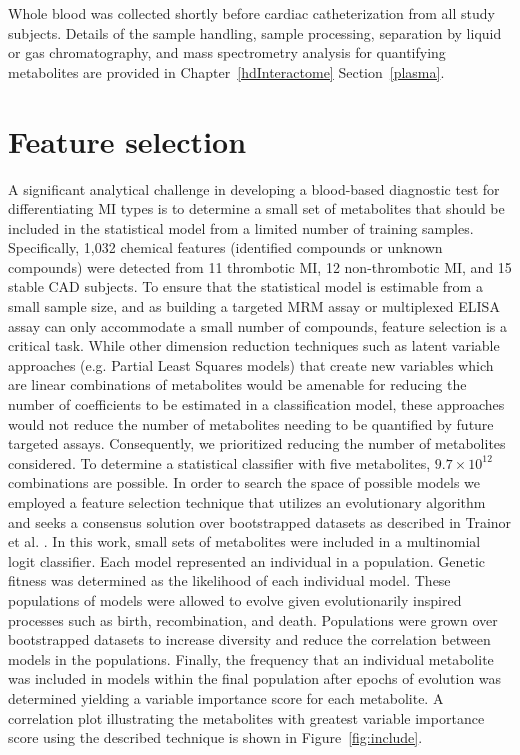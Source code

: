 \begin{DoubleSpace*}
Whole blood was collected shortly before cardiac catheterization from all study subjects. Details of the sample handling, sample processing, separation by liquid or gas chromatography, and mass spectrometry analysis for quantifying metabolites are provided in Chapter~\ref{hdInteractome} Section~\ref{plasma}. 

\section{Feature selection}
A significant analytical challenge in developing a blood-based diagnostic test for differentiating MI types is to determine a small set of metabolites that should be included in the statistical model from a limited number of training samples. Specifically, 1,032 chemical features (identified compounds or unknown compounds) were detected from 11 thrombotic MI, 12 non-thrombotic MI, and 15 stable CAD subjects. To ensure that the statistical model is estimable from a small sample size, and as building a targeted MRM assay or multiplexed ELISA assay can only accommodate a small number of compounds, feature selection is a critical task. While other dimension reduction techniques such as latent variable approaches (e.g. Partial Least Squares models) that create new variables which are linear combinations of metabolites would be amenable for reducing the number of coefficients to be estimated in a classification model, these approaches would not reduce the number of metabolites needing to be quantified by future targeted assays. Consequently, we prioritized reducing the number of metabolites considered. To determine a statistical classifier with five metabolites, $9.7 \times 10^{12}$ combinations are possible. In order to search the space of possible models we employed a feature selection technique that utilizes an evolutionary algorithm and seeks a consensus solution over bootstrapped datasets as described in Trainor et al. \cite{trainor2018}. In this work, small sets of metabolites were included in a multinomial logit classifier. Each model represented an individual in a population. Genetic fitness was determined as the likelihood of each individual model. These populations of models were allowed to evolve given evolutionarily inspired processes such as birth, recombination, and death. Populations were grown over bootstrapped datasets to increase diversity and reduce the correlation between models in the populations. Finally, the frequency that an individual metabolite was included in models within the final population after epochs of evolution was determined yielding a variable importance score for each metabolite. A correlation plot illustrating the metabolites with greatest variable importance score using the described technique is shown in Figure~\ref{fig:include}.

\end{DoubleSpace*}

